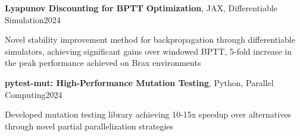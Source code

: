 \documentclass[11pt, a4paper]{article}
\newcommand{\entrytitle}[3]{%
    \noindent\textbf{#1}, #2\hfill#3%
}
\begin{document}
\entrytitle{Lyapunov Discounting for BPTT Optimization}{JAX, Differentiable Simulation}{2024}
\begin{details}
    \item Novel stability improvement method for backpropagation through differentiable simulators, achieving significant gains over windowed BPTT, 5-fold increase in the peak performance achieved on Brax environments
\end{details}

\entrytitle{pytest-mut: High-Performance Mutation Testing}{Python, Parallel Computing}{2024}
\begin{details}
    \item Developed mutation testing library achieving 10-15x speedup over alternatives through novel partial parallelization strategies
\end{details}
\end{document}

